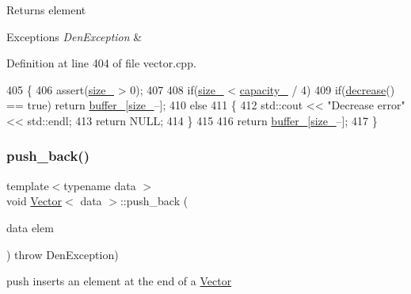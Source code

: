 \begin{DoxyReturn}{Returns}
element 
\end{DoxyReturn}

\begin{DoxyExceptions}{Exceptions}
{\em Den\+Exception} & \\
\hline
\end{DoxyExceptions}


Definition at line 404 of file vector.\+cpp.


\begin{DoxyCode}
405     \{
406         assert(\hyperlink{classVector_a3c70fa478530a90177f2a7e7621ee688}{size\_} > 0);
407 
408         \textcolor{keywordflow}{if}(\hyperlink{classVector_a3c70fa478530a90177f2a7e7621ee688}{size\_} < \hyperlink{classVector_ad75911bb39018821f0e2911b6905b7ec}{capacity\_} / 4)
409             \textcolor{keywordflow}{if}(\hyperlink{classVector_a770a5b403dcb82ea6954cda918d278d6}{decrease}() == \textcolor{keyword}{true})  \textcolor{keywordflow}{return} \hyperlink{classVector_a22db58ae9e92c6014e8ac657804a035a}{buffer\_}[\hyperlink{classVector_a3c70fa478530a90177f2a7e7621ee688}{size\_}--];
410             \textcolor{keywordflow}{else}
411                 \{
412                     std::cout << \textcolor{stringliteral}{"Decrease error"} << std::endl;
413                     \textcolor{keywordflow}{return} NULL;
414                 \}
415 
416         \textcolor{keywordflow}{return} \hyperlink{classVector_a22db58ae9e92c6014e8ac657804a035a}{buffer\_}[\hyperlink{classVector_a3c70fa478530a90177f2a7e7621ee688}{size\_}--];
417     \}
\end{DoxyCode}
\mbox{\label{classVector_a8e34f2f9943752507540bc80dba453fd}} 
\subsubsection{\texorpdfstring{push\+\_\+back()}{push\_back()}}
{\footnotesize\ttfamily template$<$typename data $>$ \\
void \hyperlink{classVector}{Vector}$<$ data $>$\+::push\+\_\+back (\begin{DoxyParamCaption}\item[{data}]{elem }\end{DoxyParamCaption}) throw  Den\+Exception) }



push  inserts an element at the end of a \hyperlink{classVector}{Vector} 


